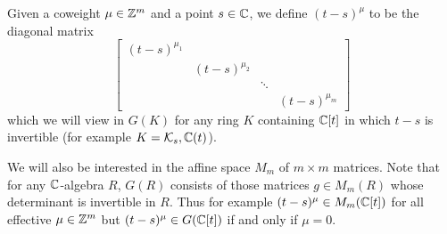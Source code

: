 \documentclass[draft]{article}
\begin{document}
Given a coweight $\mu \in \mathbb Z^m$ and a point $ s\in \mathbb C$, we define $ (t-s)^\mu$ to be the diagonal matrix 
\[
\begin{bmatrix}
    (t-s)^{\mu_1} \\
    & (t-s)^{\mu_2} \\ 
    & & \ddots \\
    & & & (t-s)^{\mu_m}
\end{bmatrix} 
\]
which we will view in 
$G(K)$ for any ring $ K $ containing $\mathbb C[t]$ in which $t-s$ is invertible (for example $ K = \mathcal K_s, \mathbb C(t)$). %

We will also be interested in the affine space $ M_m$ of $m\times m$ matrices.  Note that for any $ \mathbb C$-algebra $ R $, 
$G(R)$ consists of those matrices $ g \in M_m(R) $ whose determinant is invertible in $ R$. Thus for example $ (t-s)^\mu\in M_m(\mathbb C[t])$ for all effective $ \mu \in \mathbb Z^m$ but 
$(t-s)^\mu\in G(\mathbb C[t])$ if and only if $ \mu = 0 $.
% 
\end{document}
